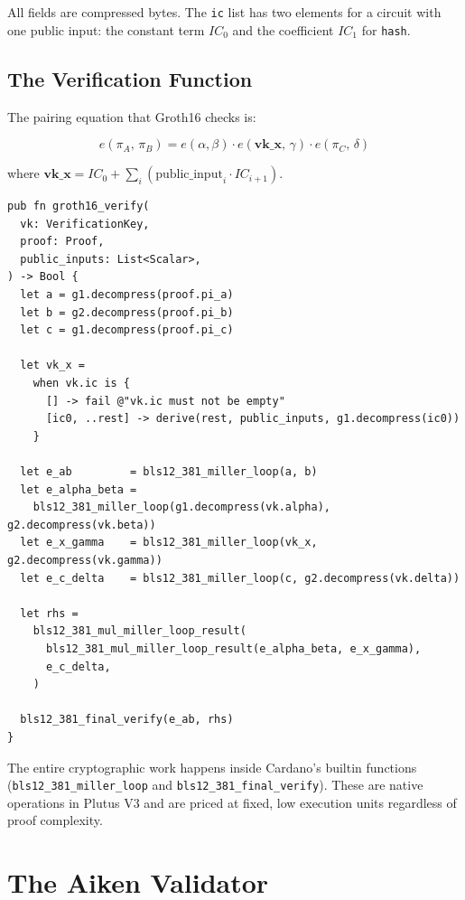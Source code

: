 All fields are compressed bytes. The \texttt{ic} list has two elements for a
circuit with one public input: the constant term $IC_0$ and the coefficient
$IC_1$ for \texttt{hash}.

\subsection*{The Verification Function}

The pairing equation that Groth16 checks is:

\[
  e(\pi_A,\, \pi_B) = e(\alpha, \beta)\cdot e(\mathbf{vk\_x},\, \gamma)\cdot e(\pi_C,\, \delta)
\]

where $\mathbf{vk\_x} = IC_0 + \sum_i (\text{public\_input}_i \cdot IC_{i+1})$.

\begin{verbatim}
pub fn groth16_verify(
  vk: VerificationKey,
  proof: Proof,
  public_inputs: List<Scalar>,
) -> Bool {
  let a = g1.decompress(proof.pi_a)
  let b = g2.decompress(proof.pi_b)
  let c = g1.decompress(proof.pi_c)

  let vk_x =
    when vk.ic is {
      [] -> fail @"vk.ic must not be empty"
      [ic0, ..rest] -> derive(rest, public_inputs, g1.decompress(ic0))
    }

  let e_ab         = bls12_381_miller_loop(a, b)
  let e_alpha_beta =
    bls12_381_miller_loop(g1.decompress(vk.alpha), g2.decompress(vk.beta))
  let e_x_gamma    = bls12_381_miller_loop(vk_x, g2.decompress(vk.gamma))
  let e_c_delta    = bls12_381_miller_loop(c, g2.decompress(vk.delta))

  let rhs =
    bls12_381_mul_miller_loop_result(
      bls12_381_mul_miller_loop_result(e_alpha_beta, e_x_gamma),
      e_c_delta,
    )

  bls12_381_final_verify(e_ab, rhs)
}
\end{verbatim}

The entire cryptographic work happens inside Cardano's builtin functions
(\texttt{bls12\_381\_miller\_loop} and \texttt{bls12\_381\_final\_verify}).
These are native operations in Plutus V3 and are priced at fixed, low execution
units regardless of proof complexity.

\section{The Aiken Validator} \label{sec:ch6-validator}

